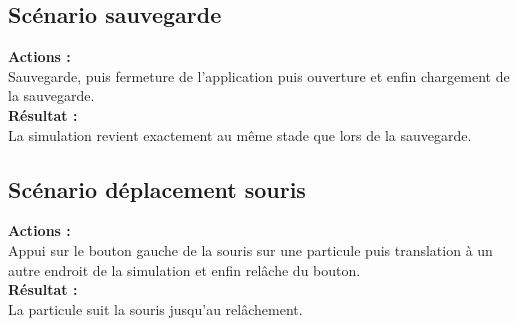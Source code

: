 \documentclass{article}
\begin{document}
\subsection{Scénario sauvegarde}
\textbf{Actions :} \\
Sauvegarde, puis fermeture de l'application puis ouverture et enfin chargement de la sauvegarde. \\
\indent\textbf{Résultat :} \\
La simulation revient exactement au même stade que lors de la sauvegarde.

\subsection{Scénario déplacement souris}
\textbf{Actions :} \\
Appui sur le bouton gauche de la souris sur une particule puis translation à un autre endroit de la simulation et enfin relâche du bouton.\\
\indent\textbf{Résultat :}\\
La particule suit la souris jusqu'au relâchement.
\end{document}
